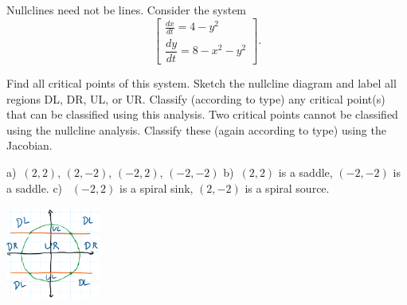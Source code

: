 \begin{exercise} Nullclines need not be lines. Consider the system
$$\begin{bmatrix} \displaystyle \frac{dx}{dt}=4-y^2\\ \dfrac{dy}{dt}=8-x^2-y^2 \end{bmatrix}.$$

\begin{tasks}
\task Find all critical points of this system.
\task Sketch the nullcline diagram and label all regions DL, DR, UL, or UR. Classify (according to type) any critical point(s) that can be classified using this analysis.
\task Two critical points cannot be classified using the nullcline analysis. Classify these (again according to type) using the Jacobian. 
\end{tasks}
\end{exercise}
\comboSol{%
}
{%
\begin{multicols}{2}
\noindent a)~$(2, 2)$, $(2, -2)$, $(-2, 2)$, $(-2, -2)$ \quad b)~$(2,2)$ is a saddle, $(-2, -2)$ is a saddle. \quad c)~ $(-2, 2)$ is a spiral sink, $(2, -2)$ is a spiral source.

\includegraphics[height=1.2in]{Images/NullclineDiagramSoln3.png}
\end{multicols}
}

